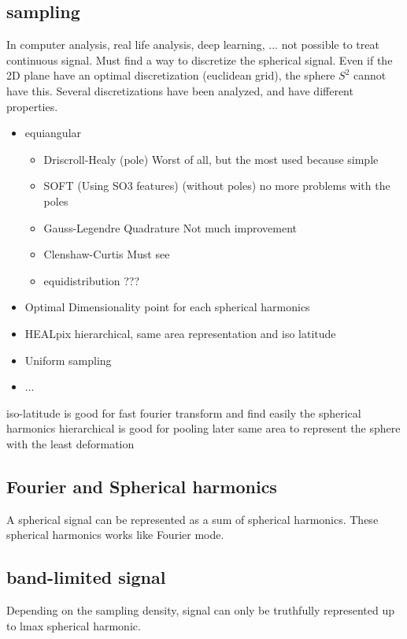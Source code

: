 \documentclass[11pt]{report}
\begin{document}
\subsection{sampling}
In computer analysis, real life analysis, deep learning, ... not possible to treat continuous signal. Must find a way to discretize the spherical signal. Even if the 2D plane have an optimal discretization (euclidean grid), the sphere $S^2$ cannot have this. %
Several discretizations have been analyzed, and have different properties.
\begin{itemize}
    \item equiangular %
    \begin{itemize}
        \item Driscroll-Healy (pole) %
        Worst of all, but the most used because simple
        \item SOFT (Using SO3 features) (without poles) %
        no more problems with the poles
        \item Gauss-Legendre Quadrature
        Not much improvement
        \item Clenshaw-Curtis
        Must see 
        \item equidistribution
        ???
    \end{itemize}
    \item Optimal Dimensionality
    point for each spherical harmonics
    \item HEALpix
    hierarchical, same area representation and iso latitude
    \item Uniform sampling
    \item ...
\end{itemize}
iso-latitude is good for fast fourier transform and find easily the spherical harmonics
hierarchical is good for pooling later
same area to represent the sphere with the least deformation
\subsection{Fourier and Spherical harmonics}
A spherical signal can be represented as a sum of spherical harmonics. These spherical harmonics  works like Fourier mode.

\subsection{band-limited signal} %
 Depending on the sampling density, signal can only be truthfully represented up to lmax spherical harmonic.
 
\end{document}
